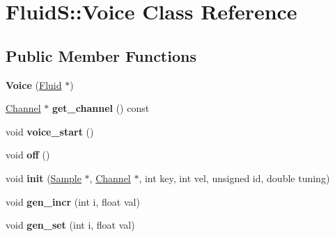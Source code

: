 \hypertarget{class_fluid_s_1_1_voice}{}\section{FluidS\+:\+:Voice Class Reference}
\label{class_fluid_s_1_1_voice}
\subsection*{Public Member Functions}
\begin{DoxyCompactItemize}
\item 
\mbox{\label{class_fluid_s_1_1_voice_a99bde03d499c8c0826397cfeef4f8f59}} 
{\bfseries Voice} (\hyperlink{class_fluid_s_1_1_fluid}{Fluid} $\ast$)
\item 
\mbox{\label{class_fluid_s_1_1_voice_aee17989d591015ac1bb530c1b59845db}} 
\hyperlink{class_fluid_s_1_1_channel}{Channel} $\ast$ {\bfseries get\+\_\+channel} () const
\item 
\mbox{\label{class_fluid_s_1_1_voice_a1508bbd8f513837917505d23b627dd33}} 
void {\bfseries voice\+\_\+start} ()
\item 
\mbox{\label{class_fluid_s_1_1_voice_a24c7a2babbd0f0714eb0e8d01730a778}} 
void {\bfseries off} ()
\item 
\mbox{\label{class_fluid_s_1_1_voice_abb4c18cb455b0de6c43ab52ec880efc1}} 
void {\bfseries init} (\hyperlink{class_fluid_s_1_1_sample}{Sample} $\ast$, \hyperlink{class_fluid_s_1_1_channel}{Channel} $\ast$, int key, int vel, unsigned id, double tuning)
\item 
\mbox{\label{class_fluid_s_1_1_voice_a9361579f265a1ce25df3a55477dc83de}} 
void {\bfseries gen\+\_\+incr} (int i, float val)
\item 
\mbox{\label{class_fluid_s_1_1_voice_a431b869873ed78c2949ca13faa6f6b99}} 
void {\bfseries gen\+\_\+set} (int i, float val)
\item 
\mbox{\label{class_fluid_s_1_1_voice_aa5a43efb6120df8c9fee504f19e43063}} 

\end{DoxyCompactItemize}
